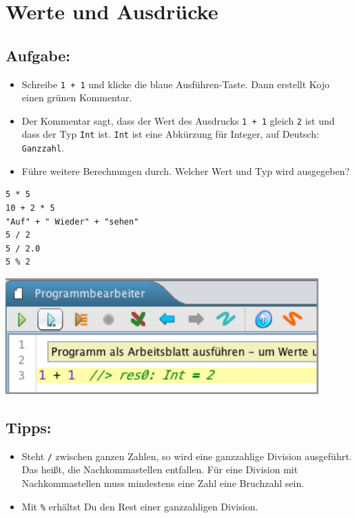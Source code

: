 \chapter{Werte und Ausdrücke}
\begin{multicols}{2}
\section*{\color{BrickRed}Aufgabe:}


\begin{itemize}

\item {Schreibe \lstinline{1 + 1} und klicke die blaue Ausführen-Taste. Dann erstellt Kojo einen grünen Kommentar.}
\item {Der Kommentar sagt, dass der Wert des Ausdrucks \lstinline{1 + 1} gleich \lstinline{2} ist und dass der Typ \lstinline{Int} ist. \lstinline{Int} ist eine Abkürzung für Integer, auf Deutsch: \lstinline{Ganzzahl}.}
\item {Führe weitere Berechnungen durch. Welcher Wert und Typ wird ausgegeben?}

\end{itemize}



\begin{lstlisting}[numbers=none]
5 * 5
10 + 2 * 5
"Auf" + " Wieder" + "sehen"
5 / 2
5 / 2.0
5 % 2
\end{lstlisting}
        


\columnbreak


\includegraphics[width=12.0cm]{../img/show-value_de.png}
\section*{\color{OliveGreen}Tipps:}


\begin{itemize}

\item {Steht \lstinline{/} zwischen ganzen Zahlen, so wird eine ganzzahlige Division ausgeführt. Das heißt, die Nachkommastellen entfallen. Für eine Division mit Nachkommastellen muss mindestens eine Zahl eine Bruchzahl sein.}
\item {Mit \lstinline{%} erhältst Du den Rest einer ganzzahligen Division.}

\end{itemize}


\end{multicols}

